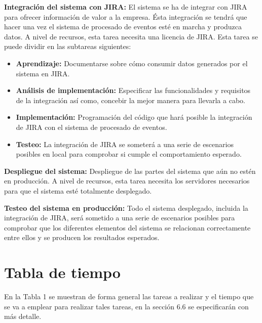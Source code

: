 \textbf{Integración del sistema con JIRA:} El sistema se ha de integrar con JIRA para ofrecer información de valor a la empresa. Ésta integración se tendrá que hacer una vez el sistema de procesado de eventos esté en marcha y produzca datos. A nivel de recursos, esta tarea necesita una licencia de JIRA. Esta tarea se puede dividir en las subtareas siguientes:
\begin{itemize}
	
	\item \textbf{Aprendizaje:} Documentarse sobre cómo consumir datos generados por el sistema en JIRA.
	
	\item \textbf{Análisis de implementación:} Especificar las funcionalidades y requisitos de la integración así como, concebir la mejor manera para llevarla a cabo.
	
	\item \textbf{Implementación:} Programación del código que hará posible la integración de JIRA con el sistema de procesado de eventos.
	
	\item \textbf{Testeo:} La integración de JIRA se someterá a una serie de escenarios posibles en local para comprobar si cumple el comportamiento esperado.
	
\end{itemize}

\textbf{Despliegue del sistema:} Despliegue de las partes del sistema que aún no estén en producción. A nivel de recursos, esta tarea necesita los servidores necesarios para que el sistema esté totalmente desplegado.

\textbf{Testeo del sistema en producción:} Todo el sistema desplegado, incluida la integración de JIRA, será sometido a una serie de escenarios posibles para comprobar que los diferentes elementos del sistema se relacionan correctamente entre ellos y se producen los resultados esperados.

\section{Tabla de tiempo}
En la Tabla 1 se muestran de forma general las tareas a realizar y el tiempo que se va a emplear para realizar tales tareas, en la sección 6.6 se especificarán con más detalle.

